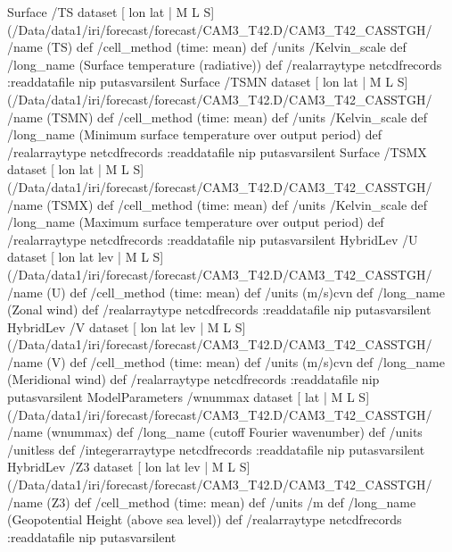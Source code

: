 \begin{ingrid}
Surface /TS{
dataset
[ lon lat | M L S] (/Data/data1/iri/forecast/forecast/CAM3_T42.D/CAM3_T42_CASSTGH/%
/name (TS) def
 /cell_method (time: mean) def
 /units /Kelvin_scale def
 /long_name (Surface temperature (radiative)) def
 /realarraytype netcdfrecords :readdatafile
nip
}putasvarsilent
Surface /TSMN{
dataset
[ lon lat | M L S] (/Data/data1/iri/forecast/forecast/CAM3_T42.D/CAM3_T42_CASSTGH/%
/name (TSMN) def
 /cell_method (time: mean) def
 /units /Kelvin_scale def
 /long_name (Minimum surface temperature over output period) def
 /realarraytype netcdfrecords :readdatafile
nip
}putasvarsilent
Surface /TSMX{
dataset
[ lon lat | M L S] (/Data/data1/iri/forecast/forecast/CAM3_T42.D/CAM3_T42_CASSTGH/%
/name (TSMX) def
 /cell_method (time: mean) def
 /units /Kelvin_scale def
 /long_name (Maximum surface temperature over output period) def
 /realarraytype netcdfrecords :readdatafile
nip
}putasvarsilent
HybridLev /U{
dataset
[ lon lat lev | M L S] (/Data/data1/iri/forecast/forecast/CAM3_T42.D/CAM3_T42_CASSTGH/%
/name (U) def
 /cell_method (time: mean) def
 /units (m/s)cvn def
 /long_name (Zonal wind) def
 /realarraytype netcdfrecords :readdatafile
nip
}putasvarsilent
HybridLev /V{
dataset
[ lon lat lev | M L S] (/Data/data1/iri/forecast/forecast/CAM3_T42.D/CAM3_T42_CASSTGH/%
/name (V) def
 /cell_method (time: mean) def
 /units (m/s)cvn def
 /long_name (Meridional wind) def
 /realarraytype netcdfrecords :readdatafile
nip
}putasvarsilent
ModelParameters /wnummax{
dataset
[ lat | M L S] (/Data/data1/iri/forecast/forecast/CAM3_T42.D/CAM3_T42_CASSTGH/%
/name (wnummax) def
 /long_name (cutoff Fourier wavenumber) def
 /units /unitless def
 /integerarraytype netcdfrecords :readdatafile
nip
}putasvarsilent
HybridLev /Z3{
dataset
[ lon lat lev | M L S] (/Data/data1/iri/forecast/forecast/CAM3_T42.D/CAM3_T42_CASSTGH/%
/name (Z3) def
 /cell_method (time: mean) def
 /units /m def
 /long_name (Geopotential Height (above sea level)) def
 /realarraytype netcdfrecords :readdatafile
nip
}putasvarsilent


\end{ingrid}